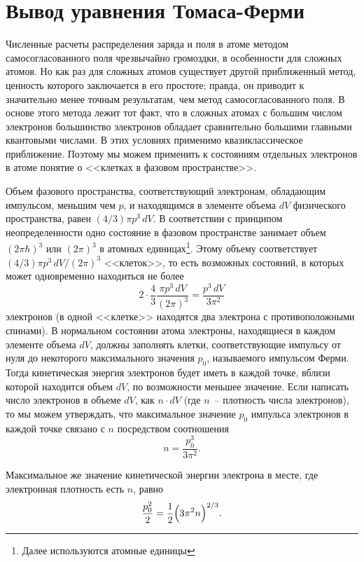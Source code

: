 \documentclass[10pt]{hedlab}
\date{04.03.2014}
\begin{document}
  \makeheader

  \section{Вывод уравнения Томаса-Ферми}

  Численные расчеты распределения заряда и поля в атоме методом
  самосогласованного поля чрезвычайно громоздки, в особенности для сложных
  атомов. Но как раз для сложных атомов существует другой приближенный метод,
  ценность которого заключается в его простоте; правда, он приводит к
  значительно менее точным результатам, чем метод самосогласованного поля. В
  основе этого метода лежит тот факт, что в сложных атомах с большим числом
  электронов большинство электронов обладает сравнительно большими главными
  квантовыми числами. В этих условиях применимо квазиклассическое приближение.
  Поэтому мы можем применить к состояниям отдельных электронов в атоме понятие
  о <<клетках в фазовом пространстве>>.

  Объем фазового пространства, соответствующий электронам, обладающим
  импульсом, меньшим чем \( p \), и находящимся в элементе объема \( dV \)
  физического пространства, равен \( (4 / 3)\pi p^3\,dV \). В соответствии с
  принципом неопределенности одно состояние в фазовом пространстве занимает
  объем \( (2\pi\hbar)^3 \) или \( (2\pi)^3 \) в атомных
  единицах\footnote{ Далее используются атомные единицы}. Этому объему
  соответствует \( (4 / 3)\pi p^3\,dV / (2\pi)^3 \) <<клеток>>, то есть
  возможных состояний, в которых может одновременно находиться не более
  \[
    2 \cdot \frac{4}{3}\frac{\pi p^3\,dV}{(2\pi)^3} = \frac{p^3\,dV}{3\pi^2}
  \]
  электронов (в одной <<клетке>> находятся два электрона с противоположными
  спинами). В нормальном состоянии атома электроны, находящиеся в каждом
  элементе объема \( dV \), должны заполнять клетки, соответствующие импульсу
  от нуля до некоторого максимального значения \( p_0 \), называемого
  импульсом Ферми. Тогда кинетическая энергия электронов будет иметь в каждой
  точке, вблизи которой находится объем \( dV \), по возможности меньшее
  значение. Если написать число электронов в объеме \( dV \), как
  \( n\cdot dV \) (где \( n \)~-- плотность числа электронов), то мы можем
  утверждать, что максимальное значение \( p_0 \) импульса электронов в каждой
  точке связано с \( n \) посредством соотношения
  \[
    n = \frac{p_0^3}{3\pi^2}.
  \]

  Максимальное же значение кинетической энергии электрона в месте, где
  электронная плотность есть \( n \), равно
  \begin{equation}
    \frac{p_0^2}{2} = \frac{1}{2} \Bigl(3\pi^2 n\Big)^{2 / 3}.
    \label{eq:1}
  \end{equation}
\end{document}
